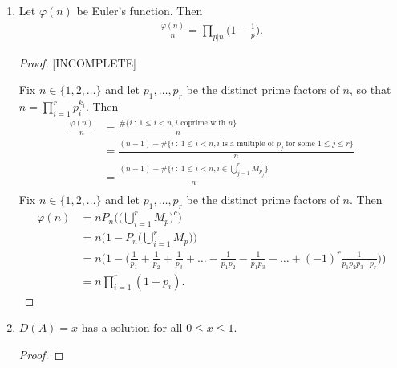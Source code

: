 \begin{enumerate}
\begin{enumerate}[label=(\alph*)]
\begin{proof}
      We want to show that $\sum_n D(L_n) \neq 1$ but that is not clear: it is given that the sum of the
      reciprocals of the primes diverges, but our sum is smaller than that.

    \end{proof}

  \item
    \begin{claim*}
      Let $\varphi(n)$ be Euler's function. Then
      \begin{align*}
        \frac{\varphi(n)}{n} = \prod_{p|n}\big(1 - \frac{1}{p}\big).
      \end{align*}
    \end{claim*}
    \begin{proof}

      [INCOMPLETE]

      Fix $n \in \{1, 2, \ldots\}$ and let $p_1, \ldots, p_r$ be the distinct prime factors of $n$, so that $n = \prod_{i=1}^rp_i^{k_i}$.
      Then
      \begin{align*}
        \frac{\varphi(n)}{n} &= \frac{\#\big\{i ~:~ 1 \leq i < n, i \text{~coprime with~} n\big\}}{n} \\
                             &= \frac{(n - 1) - \#\big\{i ~:~ 1 \leq i < n, i \text{~is a multiple of~} p_j \text{~for some~} 1 \leq j \leq r\big\}}{n} \\
                             &= \frac{(n - 1) - \#\big\{i ~:~ 1 \leq i < n, i \in \bigcup_{j=1}^r M_{p_j}\big\}}{n} \\
      \end{align*}
      Fix $n \in \{1, 2, \ldots\}$ and let $p_1, \ldots, p_r$ be the distinct prime factors of $n$.
      Then
      \begin{align*}
        \varphi(n)
        &= n P_n\Big(\big(\bigcup_{i=1}^r M_p\big)^c\Big) \\
        &= n \Big(1 - P_n\big(\bigcup_{i=1}^r M_p\big)\Big) \\
        &= n \Big(1 - \Big(\frac{1}{p_1} + \frac{1}{p_2} + \frac{1}{p_3} + \ldots - \frac{1}{p_1p_2} - \frac{1}{p_1p_3} - \ldots + (-1)^r\frac{1}{p_1p_2p_3\cdots p_r}\Big)\Big) \\
        &= n \prod_{i=1}^r(1 - p_i).
      \end{align*}
    \end{proof}

  \item
    \begin{claim*}
	    $D(A) = x$ has a solution for all $0 \leq x \leq 1$.
    \end{claim*}
    \begin{proof}


\end{proof}
\end{enumerate}
\end{enumerate}
